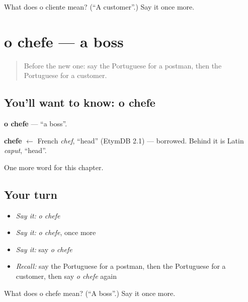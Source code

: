 \begin{tcolorbox}[breakable,colback=teal!4,colframe=teal!35!black,title={Before you move on}]
What does o cliente mean? (\textquotedblleft{}A customer\textquotedblright{}.) Say it once more.
\end{tcolorbox}
\section[o chefe]{o chefe — a boss}

\label{lesson:PT-C112-chefe}



\begin{quote}
Before the new one: say the Portuguese for a postman, then the Portuguese for a customer.
\end{quote}

\subsection*{You'll want to know: o chefe}
\textbf{o chefe} — \textquotedblleft{}a boss\textquotedblright{}.

\begin{cousinweb}
\textbf{chefe} $\leftarrow$ French \emph{chef}, \textquotedblleft{}head\textquotedblright{} (EtymDB 2.1) — borrowed. Behind it is Latin \emph{caput}, \textquotedblleft{}head\textquotedblright{}.
\end{cousinweb}

\begin{grammarlens}[title={What you've built}]
One more word for this chapter.
\end{grammarlens}

\subsection*{Your turn}
\begin{itemize}
\raggedright
  \item \emph{Say it:} \emph{o chefe}
  \item \emph{Say it:} \emph{o chefe}, once more
  \item \emph{Say it:} say \emph{o chefe}
  \item \emph{Recall:} say the Portuguese for a postman, then the Portuguese for a customer, then say \emph{o chefe} again
\end{itemize}

\begin{tcolorbox}[breakable,colback=teal!4,colframe=teal!35!black,title={Before you move on}]
What does o chefe mean? (\textquotedblleft{}A boss\textquotedblright{}.) Say it once more.
\end{tcolorbox}
